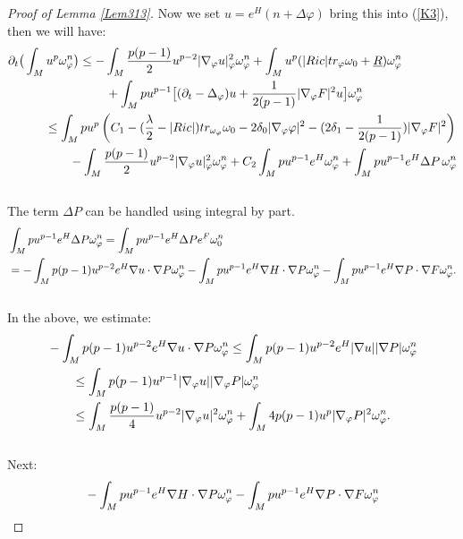 \documentclass[11pt]{amsart}
\numberwithin{equation}{section}
\begin{document}
\begin{proof}[Proof of Lemma \ref{Lem313}]
Now we set \( u = e^H(n + \Delta\varphi) \) bring this into (\ref{K3}), then we will have:
\begin{align}\label{K4}
	 & \partial_t\big( \int_M u^p\omega_\varphi^n\big)\le  - \int_M \frac{p(p-1)}{2} u^{p-2} |\nabla_\varphi u|^2_\varphi\omega_\varphi^n +\int_M u^p(|Ric|tr_\varphi\omega_0+\underline R)\omega_\varphi^n \notag\\
	 &\quad\quad\qquad\qquad\qquad +\int_M pu^{p-1}\big[(\partial_t-\Delta_\varphi)u+  \frac{1}{2(p-1)}|\nabla_\varphi F|^2 u  \big]\omega_\varphi^n \notag\\
	&\quad\qquad \le  \int_M pu^p \left(C_1 - (\frac{\lambda}{2}-|Ric|)tr_{\omega_{\varphi}}\omega_0 - 2\delta_0|\nabla_{\varphi}\varphi|^2 - (2\delta_1-\frac{1}{2(p-1)}) |\nabla_{\varphi}F|^2 \right) \notag\\
	&\quad\qquad\qquad - \int_M \frac{p(p-1)}{2} u^{p-2} |\nabla_\varphi u|^2_\varphi\omega_\varphi^n +C_2 \int_M pu^{p-1}e^H\omega_\varphi^n+ \int_M pu^{p-1}e^H\Delta P\, \omega_\varphi^n
\end{align}\\
The term $\Delta P$ can be handled using integral by part. 
\begin{align}\label{0.2N}
	& \int_M p u^{p-1} e^H \Delta P \omega_{\varphi}^n = \int_M p u^{p-1} e^H \Delta P e^F \omega_0^n \notag\\
	& = - \int_M p(p-1) u^{p-2} e^H \nabla u \cdot \nabla P \omega_{\varphi}^n - \int_M p u^{p-1} e^H \nabla H \cdot \nabla P \omega_{\varphi}^n  - \int_M p u^{p-1} e^H \nabla P \cdot \nabla F \omega_{\varphi}^n.
\end{align}\\
In the above, we estimate:
\begin{align}
	& - \int_M p(p-1) u^{p-2} e^H \nabla u \cdot \nabla P \omega_{\varphi}^n \le  \int_M p(p-1) u^{p-2} e^H |\nabla u||\nabla P| \omega_{\varphi}^n \notag\\
	&\qquad \le  \int_M p(p-1) u^{p-1} |\nabla_{\varphi} u||\nabla_{\varphi} P| \omega_{\varphi}^n \notag\\
	&\qquad \le  \int_M \frac{p(p-1)}{4} u^{p-2} |\nabla_{\varphi} u|^2 \omega_{\varphi}^n  + \int_M 4p(p-1) u^p |\nabla_{\varphi} P|^2 \omega_{\varphi}^n.
\end{align}\\
Next:
\begin{align}\label{0.4N}
	& -\int_M p u^{p-1} e^H \nabla H \cdot \nabla P \omega_{\varphi}^n - \int_M p u^{p-1} e^H \nabla P \cdot \nabla F \omega_{\varphi}^n \notag\\

\end{align}
\end{proof}
\end{document}
